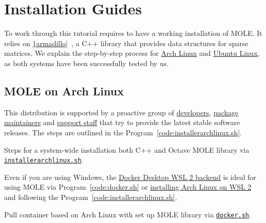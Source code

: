 \chapter{Installation Guides}

To work through this tutorial requires to have a working installation
of MOLE.
It relies on
\href{https://gitlab.com/conradsnicta/armadillo-code}{\texttt|armadillo|}~\cite{Sanderson2025},
a C++ library that provides data structures for sparse matrices.
We explain the step-by-step process for
\href{https://wiki.archlinux.org/title/Pacman/Rosetta}{Arch Linux}
and \href{https://help.ubuntu.com/lts/ubuntu-help/index.html}{Ubuntu Linux},
as both systems have been successfully tested by us.

\section{MOLE on Arch Linux}

This distribution is supported by a proactive group of
\href{https://archlinux.org/people/developers}{developers},
\href{https://archlinux.org/people/package-maintainers}{package maintainers}
and \href{https://archlinux.org/people/support-staff}{support staff}
that try to provide the latest stable software releases.
The steps are outlined in the Program~\ref{code:installerarchlinux.sh}.

\begin{listing}[ht!]
	\tiny
	\centering
	\caption{Steps for a system-wide installation both C++ and Octave
		MOLE library via
		\href{https://raw.githubusercontent.com/carlosal1015/mole_examples/main/tutorial/installerarchlinux.sh}{\texttt{installerarchlinux.sh}}.}
	\label{code:installerarchlinux.sh}
\end{listing}

Even if you are using Windows, the
\href{https://docs.docker.com/desktop/features/wsl}{Docker Desktop WSL 2 backend}
is ideal for using MOLE via Program~\ref{code:docker.sh} or
\href{https://wiki.archlinux.org/title/Install_Arch_Linux_on_WSL}{installing Arch Linux on WSL 2} and following
the Program~\ref{code:installerarchlinux.sh}.

\begin{listing}[ht!]
	\tiny
	\centering
	\caption{Pull container based on Arch Linux with set up MOLE
		library via \href{https://raw.githubusercontent.com/carlosal1015/mole_examples/main/tutorial/docker.sh}{\texttt{docker.sh}}.}
	\label{code:docker.sh}
\end{listing}


